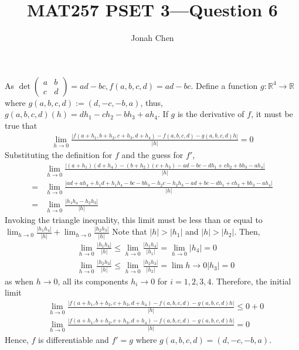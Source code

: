 \documentclass{exam}
\title{MAT257 PSET 3---Question 6}
\author{Jonah Chen}
\numberwithin{equation}{section}
\newcommand{\R}{\mathbb{R}}
\begin{document}
    \sffamily
    \maketitle
    As $\det\begin{pmatrix}
        a & b\\c & d
    \end{pmatrix}=ad-bc, f(a,b,c,d)=ad-bc$. Define a function $g:\R^4\to\R$ where $g(a,b,c,d) := (d,-c,-b,a)$, thus, $g(a,b,c,d)(h)=dh_1-ch_2-bh_3+ah_4$. If $g$ is the derivative of $f$, it must be true that 
    \begin{align*}
        \lim_{h\to0}\frac{|f(a+h_1,b+h_2,c+h_3,d+h_4)-f(a,b,c,d)-g(a,b,c,d)h|}{|h|}=0
    \end{align*}
    Substituting the definition for $f$ and the guess for $f'$,
    \begin{align*}
        &\lim_{h\to0}\frac{|(a+h_1)(d+h_4)-(b+h_2)(c+h_3)-ad-bc-dh_1+ch_2+bh_3-ah_4|}{|h|}\\
        =&\lim_{h\to 0}\frac{|ad+ah_4+h_1d+h_1h_4-bc-bh_3-h_2c-h_2h_3-ad+bc-dh_1+ch_2+bh_3-ah_4|}{|h|}\\
        =&\lim_{h\to 0}\frac{|h_1h_4-h_2h_3|}{|h|}
    \end{align*}
    Invoking the triangle inequality, this limit must be less than or equal to $\lim_{h\to 0}\frac{|h_1h_4|}{|h|}+\lim_{h\to 0}\frac{|h_2h_3|}{|h|}$ Note that $|h|>|h_1|$ and $|h|>|h_2|$. Then,
    \begin{align*}
        &\lim_{h\to 0}\frac{|h_1h_4|}{|h|}\leq\lim_{h\to 0}\frac{|h_1h_4|}{|h_1|}=\lim_{h\to 0}|h_4|=0\\
        &\lim_{h\to 0}\frac{|h_2h_3|}{|h|}\leq\lim_{h\to 0}\frac{|h_2h_3|}{|h_2|}=\lim{h\to 0}|h_3|=0
    \end{align*}
    as when $h\to0$, all its components $h_i\to 0$ for $i=1,2,3,4$.
    Therefore, the initial limit 
    \begin{align*}
        &\lim_{h\to0}\frac{|f(a+h_1,b+h_2,c+h_3,d+h_4)-f(a,b,c,d)-g(a,b,c,d)h|}{|h|}\leq 0+0\\
        &\lim_{h\to0}\frac{|f(a+h_1,b+h_2,c+h_3,d+h_4)-f(a,b,c,d)-g(a,b,c,d)h|}{|h|}=0
    \end{align*}
    Hence, $f$ is differentiable and $f'=g$ where $g(a,b,c,d)=(d,-c,-b,a)$.
\end{document}
